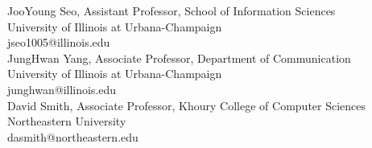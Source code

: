 \documentclass{article}
\begin{document}
\noindent JooYoung Seo, Assistant Professor, School of Information Sciences \\
University of Illinois at Urbana-Champaign \\
jseo1005@illinois.edu \\

\noindent JungHwan Yang, Associate Professor, Department of Communication \\
University of Illinois at Urbana-Champaign \\
junghwan@illinois.edu \\

\noindent David Smith, Associate Professor, Khoury College of Computer Sciences \\
Northeastern University \\
dasmith@northeastern.edu \\
\end{document}
